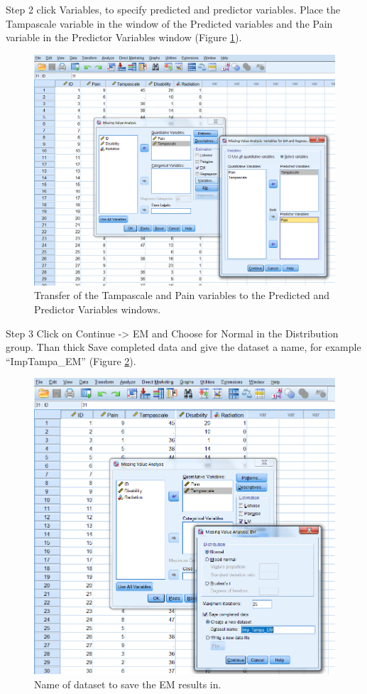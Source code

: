 \documentclass[]{book}
\theoremstyle{definition}
\theoremstyle{definition}
\theoremstyle{definition}
\theoremstyle{remark}
\begin{document}
Step 2 click Variables, to specify predicted and predictor variables.
Place the Tampascale variable in the window of the Predicted variables
and the Pain variable in the Predictor Variables window (Figure
\ref{fig:fig3-11}).

\begin{figure}

{\centering \includegraphics[width=0.7\linewidth]{images/fig3.11} 

}

\caption{Transfer of the Tampascale and Pain variables to the Predicted and Predictor Variables windows.}\label{fig:fig3-11}
\end{figure}

Step 3 Click on Continue -\textgreater{} EM and Choose for Normal in the
Distribution group. Than thick Save completed data and give the dataset
a name, for example ``ImpTampa\_EM'' (Figure \ref{fig:fig3-12}).

\begin{figure}

{\centering \includegraphics[width=0.7\linewidth]{images/fig3.12} 

}

\caption{Name of dataset to save the EM results in.}\label{fig:fig3-12}
\end{figure}
\end{document}
